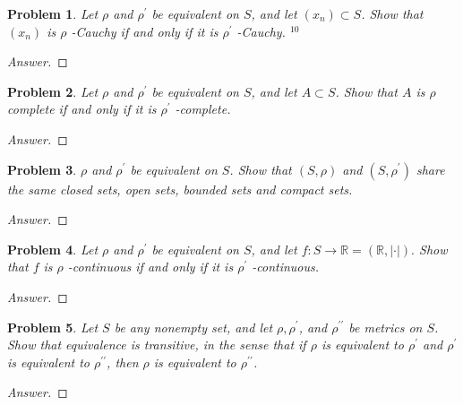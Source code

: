 \documentclass{article}
\newtheorem{problem}{Problem}[section]
\begin{document}
\begin{problem} Let $\rho$ and $\rho^{\prime}$ be equivalent on $S$, and let $\left(x_{n}\right) \subset S$. Show that $\left(x_{n}\right)$ is $\rho$ -Cauchy if and only if it is $\rho^{\prime}$ -Cauchy. $^{10}$
\end{problem}
\begin{proof}[Answer]
    
\end{proof}
\begin{problem} Let $\rho$ and $\rho^{\prime}$ be equivalent on $S$, and let $A \subset S$. Show that $A$ is $\rho$ complete if and only if it is $\rho^{\prime}$ -complete.
\end{problem}
\begin{proof}[Answer]
    
\end{proof}
\begin{problem} $\rho$ and $\rho^{\prime}$ be equivalent on $S$. Show that $(S, \rho)$ and $\left(S, \rho^{\prime}\right)$ share the same closed sets, open sets, bounded sets and compact sets.
\end{problem}
\begin{proof}[Answer]
    
\end{proof}
\begin{problem} Let $\rho$ and $\rho^{\prime}$ be equivalent on $S$, and let $f: S \rightarrow \mathbb{R}=(\mathbb{R},|\cdot|) .$ Show that $f$ is $\rho$ -continuous if and only if it is $\rho^{\prime}$ -continuous.
\end{problem}
\begin{proof}[Answer]
    
\end{proof}
\begin{problem} Let $S$ be any nonempty set, and let $\rho, \rho^{\prime}$, and $\rho^{\prime \prime}$ be metrics on $S$. Show that equivalence is transitive, in the sense that if $\rho$ is equivalent to $\rho^{\prime}$ and $\rho^{\prime}$ is equivalent to $\rho^{\prime \prime}$, then $\rho$ is equivalent to $\rho^{\prime \prime}$.
\end{problem}
\begin{proof}[Answer]
    
\end{proof}
\end{document}
